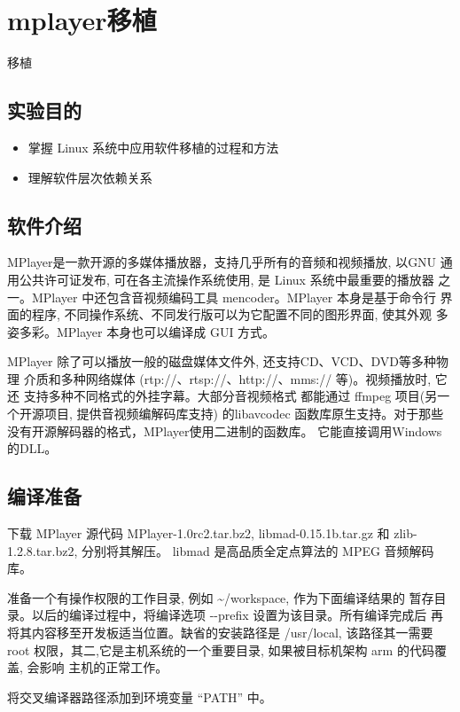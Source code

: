 \chapter{mplayer移植}{移植}

\section{实验目的}
\begin{itemize}
  \item 掌握 Linux 系统中应用软件移植的过程和方法
  \item 理解软件层次依赖关系
\end{itemize}

\section{软件介绍}

MPlayer是一款开源的多媒体播放器，支持几乎所有的音频和视频播放, 以GNU
通用公共许可证发布, 可在各主流操作系统使用, 是 Linux 系统中最重要的播放器
之一。MPlayer 中还包含音视频编码工具 mencoder。MPlayer 本身是基于命令行
界面的程序, 不同操作系统、不同发行版可以为它配置不同的图形界面, 使其外观
多姿多彩。MPlayer 本身也可以编译成 GUI 方式。

MPlayer 除了可以播放一般的磁盘媒体文件外, 还支持CD、VCD、DVD等多种物理
介质和多种网络媒体 (rtp://、rtsp://、http://、mms:// 等)。视频播放时, 它还
支持多种不同格式的外挂字幕。大部分音视频格式
都能通过 ffmpeg 项目(另一个开源项目, 提供音视频编解码库支持) 的libavcodec
函数库原生支持。对于那些没有开源解码器的格式，MPlayer使用二进制的函数库。
它能直接调用Windows的DLL。

\section{编译准备}

下载 MPlayer 源代码 MPlayer-1.0rc2.tar.bz2, libmad-0.15.1b.tar.gz 和
zlib-1.2.8.tar.bz2, 分别将其解压。
libmad 是高品质全定点算法的 MPEG 音频解码库。

准备一个有操作权限的工作目录, 例如 \textasciitilde/workspace, 作为下面编译结果的
暂存目录。以后的编译过程中，将编译选项 -{}-prefix 设置为该目录。所有编译完成后
再将其内容移至开发板适当位置。缺省的安装路径是 /usr/local, 该路径其一需要root
权限，其二,它是主机系统的一个重要目录, 如果被目标机架构 arm 的代码覆盖, 会影响
主机的正常工作。

	将交叉编译器路径添加到环境变量 ``PATH'' 中。

